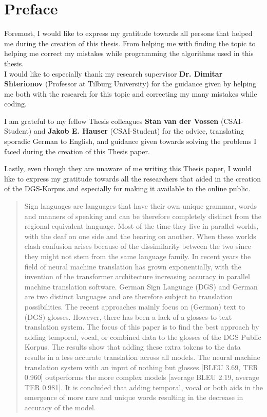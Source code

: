 
\section*{Preface}

Foremost, I would like to express my gratitude towards all persons that helped me during the creation of this thesis. From helping me with finding the topic to helping me correct my mistakes while programming the algorithms used in this thesis. 
\\

I would like to especially thank my research supervisor \textbf{Dr. Dimitar Shterionov} (Professor at Tilburg University) for the guidance given by helping me both with the research for this topic and correcting my many mistakes while coding. 

I am grateful to my fellow Thesis colleagues \textbf{Stan van der Vossen} (CSAI-Student) and \textbf{Jakob E. Hauser} (CSAI-Student) for the advice, translating sporadic German to English, and guidance given towards solving the problems I faced during the creation of this Thesis paper.

Lastly, even though they are unaware of me writing this Thesis paper, I would like to express my gratitude towards all the researchers that aided in the creation of the DGS-Korpus and especially for making it available to the online public.


\begin{abstract}

Sign languages are languages that have their own unique grammar, words and manners of speaking and can be therefore completely distinct from the regional equivalent language. Most of the time they live in parallel worlds, with the deaf on one side and the hearing on another. When these worlds clash confusion arises because of the dissimilarity between the two since they might not stem from the same language family. In recent years the field of neural machine translation has grown exponentially, with the invention of the transformer architecture increasing accuracy in parallel machine translation software. German Sign Language (DGS) and German are two distinct languages and are therefore subject to translation possibilities. The recent approaches mainly focus on (German) text to (DGS) glosses. However,  there has been a lack of a glosses-to-text translation system. The focus of this paper is to find the best approach by adding temporal, vocal, or combined data to the glosses of the DGS Public Korpus. The results show that adding these extra tokens to the data results in a less accurate translation across all models. The neural machine translation system with an input of nothing but glosses [BLEU 3.69, TER 0.960] outperforms the more complex models [average BLEU 2.19, average TER 0.981]. It is concluded that adding temporal, vocal or both aids in the emergence of more rare and unique words resulting in the decrease in accuracy of the model.

\end{abstract}

